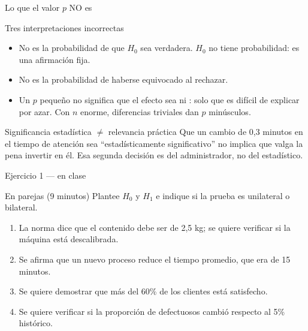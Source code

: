 \documentclass[aspectratio=169,10pt]{beamer}
\begin{document}
\begin{frame}{Lo que el valor $p$ NO es}
  \small
  \begin{alertblock}{Tres interpretaciones incorrectas}
    \footnotesize
    \begin{itemize}
      \item No es la probabilidad de que $H_0$ sea verdadera. $H_0$ no tiene
            probabilidad: es una afirmación fija.
      \item No es la probabilidad de haberse equivocado al rechazar.
      \item Un $p$ pequeño no significa que el efecto sea  ni
            : solo que es difícil de explicar por azar. Con
            $n$ enorme, diferencias triviales dan $p$ minúsculos.
    \end{itemize}
  \end{alertblock}

  \vspace{0.2cm}
  \begin{block}{Significancia estadística $\neq$ relevancia práctica}
    \footnotesize
    Que un cambio de 0{,}3 minutos en el tiempo de atención sea
    ``estadísticamente significativo'' no implica que valga la pena invertir en
    él. Esa segunda decisión es del administrador, no del estadístico.
  \end{block}
\end{frame}

\begin{frame}{Ejercicio 1 — en clase}
  \begin{alertblock}{En parejas (9 minutos)}
    Plantee $H_0$ y $H_1$ e indique si la prueba es unilateral o bilateral.

    \vspace{0.25cm}
    \begin{enumerate}
      \item La norma dice que el contenido debe ser de 2{,}5 kg; se quiere
            verificar si la máquina está descalibrada.
      \item Se afirma que un nuevo proceso reduce el tiempo promedio, que era
            de 15 minutos.
      \item Se quiere demostrar que más del 60\% de los clientes está
            satisfecho.
      \item Se quiere verificar si la proporción de defectuosos cambió respecto
            al 5\% histórico.
    \end{enumerate}
  \end{alertblock}
\end{frame}
\end{document}
